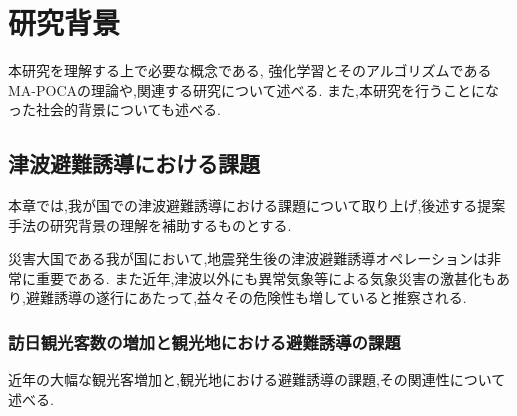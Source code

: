 \chapter{研究背景}

本研究を理解する上で必要な概念である, 強化学習とそのアルゴリズムであるMA-POCAの理論や,関連する研究について述べる.
また,本研究を行うことになった社会的背景についても述べる.

\section{津波避難誘導における課題}
本章では,我が国での津波避難誘導における課題について取り上げ,後述する提案手法の研究背景の理解を補助するものとする.\par 

災害大国である我が国において,地震発生後の津波避難誘導オペレーションは非常に重要である.
また近年,津波以外にも異常気象等による気象災害の激甚化もあり,避難誘導の遂行にあたって,益々その危険性も増していると推察される.\par 

\subsection{訪日観光客数の増加と観光地における避難誘導の課題}
近年の大幅な観光客増加と,観光地における避難誘導の課題,その関連性について述べる.
